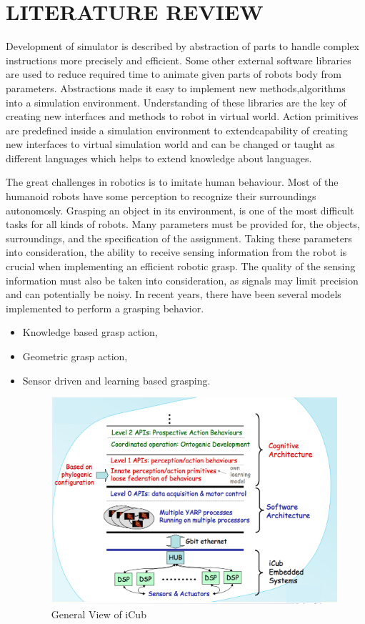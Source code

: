 \documentclass[a4paper, 12pt]{report}
\begin{document}
\chapter{LITERATURE REVIEW}
Development of simulator is described by abstraction of parts to handle 
complex instructions more precisely and efficient. Some other external 
software 
libraries are used to reduce required time to animate given parts of robots 
body from parameters. Abstractions made it easy to implement new 
methods,algorithms into a simulation environment. Understanding of these 
libraries are the key of creating new interfaces and methods to robot in 
virtual world. Action primitives are predefined inside a simulation 
environment to extendcapability of creating new interfaces to virtual 
simulation world and can be changed or taught as different languages which 
helps to extend knowledge about languages.

The great challenges in robotics is to imitate human behaviour. Most of the 
humanoid robots have some perception to recognize their surroundings 
autonomosly. Grasping an object in its environment, is one of the most 
difficult tasks for all kinds of robots. Many parameters must be provided for, 
the objects, surroundings, and the specification of the assignment. Taking 
these parameters into consideration, the ability to receive sensing information 
from the robot is crucial when implementing an efficient robotic grasp. The 
quality of the sensing information 
must also be taken into consideration, as signals may limit precision and can 
potentially be noisy. In recent years, there have been several models 
implemented to perform a grasping behavior.\textbf{\cite{vernon}}
\begin{itemize}
\item Knowledge based grasp action,
\item Geometric grasp action,
\item Sensor driven and learning based grasping.
\begin{figure}[h!]
\centering
\includegraphics[width=0.7\linewidth]{generalView}
\caption{General View of iCub}
\label{fig:generalView}
\end{figure}
\end{itemize}
\end{document}
